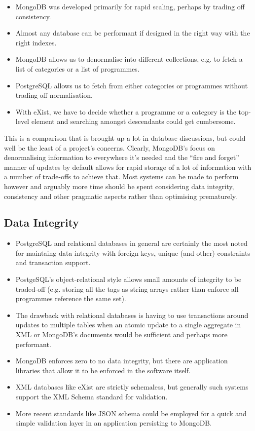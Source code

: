 \documentclass[11pt,a4paper]{article}
\begin{document}
\begin{itemize}
  \item MongoDB was developed primarily for rapid scaling, perhaps by
    trading off consistency.
  \item Almost any database can be performant if designed in the right
    way with the right indexes.
  \item MongoDB allows us to denormalise into different collections, e.g.
    to fetch a list of categories or a list of programmes.
  \item PostgreSQL allows us to fetch from either categories or programmes
    without trading off normalisation.
  \item With eXist, we have to decide whether a programme or a category
    is the top-level element and searching amongst descendants could get
    cumbersome.
\end{itemize}

This is a comparison that is brought up a lot in database discussions, but
could well be the least of a project's concerns. Clearly, MongoDB's focus
on denormalising information to everywhere it's needed and the
``fire and forget'' manner of updates by default allows for rapid storage
of a lot of information with a number of trade-offs to achieve that. Most
systems can be made to perform however and arguably more time should
be spent considering data integrity, consistency and other pragmatic aspects
rather than optimising prematurely.

\subsection{Data Integrity}

\begin{itemize}
  \item PostgreSQL and relational databases in general are certainly the
    most noted for maintaing data integrity with foreign keys, unique
    (and other) constraints and transaction support.
  \item PostgeSQL's object-relational style allows small amounts of
    integrity to be traded-off (e.g. storing all the tags as string
    arrays rather than enforce all programmes reference the same set).
  \item The drawback with relational databases is having to use transactions
    around updates to multiple tables when an atomic update to a single
    aggregate in XML or MongoDB's documents would be sufficient and perhaps
    more performant.
  \item MongoDB enforces zero to no data integrity, but there are
    application libraries that allow it to be enforced in the software
    itself.
  \item XML databases like eXist are strictly schemaless, but generally
    such systems support the XML Schema standard for validation.
  \item More recent standards like JSON schema could be employed for
    a quick and simple validation layer in an application persisting
    to MongoDB.
\end{itemize}
\end{document}
